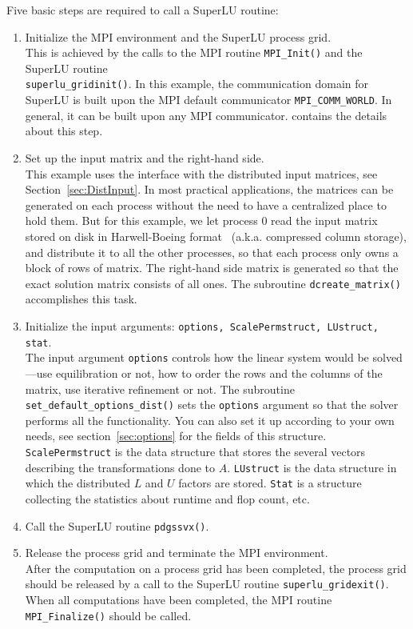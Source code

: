 Five basic steps are required to call a SuperLU routine:
\begin{enumerate}
\item Initialize the MPI environment and the SuperLU process grid.\\
	This is achieved by the calls to the MPI routine {\tt MPI\_Init()}
	and the SuperLU routine\\ {\tt superlu\_gridinit()}.
	In this example, the communication domain for SuperLU is built upon
	the MPI default communicator {\tt MPI\_COMM\_WORLD}.
	In general, it can be built upon any MPI communicator.
	 contains the details about this step.
\item Set up the input matrix and the right-hand side.\\
        This example uses the interface with the distributed input matrices,
        see Section~\ref{sec:DistInput}.
        In most practical applications, the matrices can be
        generated on each process without the need to have a centralized
        place to hold them.
        But for this example, we let process 0 read the input matrix stored
        on disk	in Harwell-Boeing format~\cite{duffgrimes92}
        (a.k.a. compressed column storage), and distribute it to all the
        other processes, so that each process only owns a block of rows of
        matrix. The right-hand side matrix is generated
	so that the exact solution matrix consists of all ones.
        The subroutine {\tt dcreate\_matrix()} accomplishes this task.
\item Initialize the input arguments: {\tt options, ScalePermstruct, LUstruct,
        stat}.\\
        The input argument {\tt options} controls how the linear system would
  	be solved---use equilibration or not, how to order the rows and
	the columns of the matrix, use iterative refinement or not.
	The subroutine {\tt set\_default\_options\_dist()} sets the
        {\tt options} argument so that the solver performs all the
        functionality. You can also set it up according to your own needs,
        see section~\ref{sec:options} for the fields of this structure.
        {\tt ScalePermstruct} is the data structure that stores 
	the several vectors describing the transformations
        done to $A$. {\tt LUstruct} is the data structure
        in which the distributed $L$ and $U$ factors are stored.
	{\tt Stat} is a structure collecting the statistics about
	runtime and flop count, etc.
\item Call the SuperLU routine {\tt pdgssvx()}.
\item Release the process grid and terminate the MPI environment.\\
	After the computation on a process grid has been completed, the
	process grid should be released by a call to the SuperLU routine
	{\tt superlu\_gridexit()}.
        When all computations have been completed, the MPI routine
        {\tt MPI\_Finalize()} should be called.
\end{enumerate}


